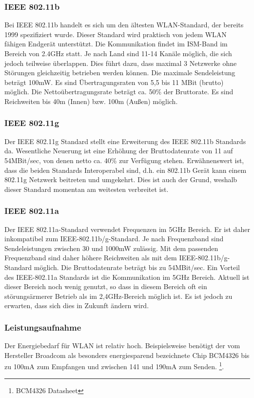 \subsubsection{IEEE 802.11b}
Bei IEEE 802.11b handelt es sich um den ältesten WLAN-Standard, der bereits 1999 
spezifiziert wurde. Dieser Standard wird praktisch von jedem WLAN fähigen 
Endgerät unterstützt. Die Kommunikation findet im ISM-Band im Bereich von 2.4GHz
statt. Je nach Land sind 11-14 Kanäle möglich, die sich jedoch teilweise überlappen.
Dies führt dazu, dass maximal 3 Netzwerke ohne Störungen gleichzeitig betrieben werden
können. Die maximale Sendeleistung beträgt 100mW. Es sind Übertragungsraten von 
5,5 bis 11 MBit (brutto) möglich. Die Nettoübertragungsrate beträgt ca. 50\% der
Bruttorate. Es sind Reichweiten bis 40m (Innen) bzw. 100m (Außen) möglich.

\subsubsection{IEEE 802.11g}
Der IEEE 802.11g Standard stellt eine Erweiterung des IEEE 802.11b Standards da.
Wesentliche Neuerung ist eine Erhöhung der Bruttodatenrate von 11 auf 54MBit/sec,
von denen netto ca. 40\% zur Verfügung stehen. Erwähnenswert ist, dass die
beiden Standards Interoperabel sind, d.h. ein 802.11b Gerät kann einem
802.11g Netzwerk beitreten und umgekehrt. Dies ist auch der Grund, weshalb
dieser Standard momentan am weitesten verbreitet ist.

\subsubsection{IEEE 802.11a}
Der IEEE 802.11a-Standard verwendet Frequenzen im 5GHz Bereich. Er ist daher
inkompatibel zum IEEE-802.11b/g-Standard. Je nach Frequenzband sind 
Sendeleistungen zwischen 30 und 1000mW zulässig. Mit dem passenden Frequenzband
sind daher höhere Reichweiten als mit dem IEEE-802.11b/g-Standard möglich.
Die Bruttodatenrate beträgt bis zu 54MBit/sec. 
Ein Vorteil des IEEE-802.11a Standards ist die Kommunikation im 5GHz Bereich.
Aktuell ist dieser Bereich noch wenig genutzt, so dass in diesem
Bereich oft ein störungsärmerer Betrieb als im 2,4GHz-Bereich möglich ist.
Es ist jedoch zu erwarten, dass sich dies in Zukunft ändern wird.

\subsubsection{Leistungsaufnahme}
Der Energiebedarf für WLAN ist relativ hoch. Beispielsweise benötigt der
vom Hersteller Broadcom als besonders energiesparend bezeichnete Chip
BCM4326 bis zu 100mA zum Empfangen und zwischen 141 und 190mA zum Senden.
\footnote{BCM4326 Datasheet}. 

